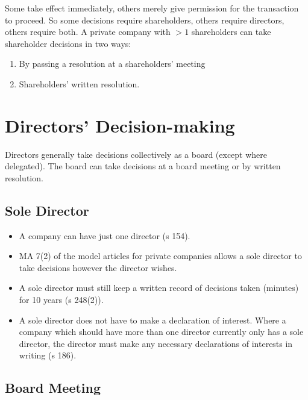 \documentclass[
]{article}
\providecommand{\tightlist}{%
  \setlength{\itemsep}{0pt}\setlength{\parskip}{0pt}}
\begin{document}
Some take effect immediately, others merely give permission for the
transaction to proceed. So some decisions require shareholders, others
require directors, others require both. A private company with {\(> 1\)}
shareholders can take shareholder decisions in two ways:

\begin{enumerate}
\tightlist
\item
  By passing a resolution at a shareholders' meeting
\item
  Shareholders' written resolution.
\end{enumerate}

\hypertarget{directors-decision-making}{%
\section{Directors' Decision-making}\label{directors-decision-making}}

Directors generally take decisions collectively as a board (except where
delegated). The board can take decisions at a board meeting or by
written resolution.

\hypertarget{sole-director}{%
\subsection{Sole Director}\label{sole-director}}

\begin{itemize}
\tightlist
\item
  A company can have just one director (s 154).
\item
  MA 7(2) of the model articles for private companies allows a sole
  director to take decisions however the director wishes.
\item
  A sole director must still keep a written record of decisions taken
  (minutes) for 10 years (s 248(2)).
\item
  A sole director does not have to make a declaration of interest. Where
  a company which should have more than one director currently only has
  a sole director, the director must make any necessary declarations of
  interests in writing (s 186).
\end{itemize}

\hypertarget{board-meeting}{%
\subsection{Board Meeting}\label{board-meeting}}
\end{document}
